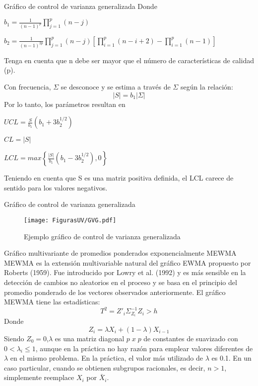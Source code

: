 \documentclass[10pt]{beamer}
\begin{document}
\begin{frame}{Gráfico de control de varianza generalizada}
Donde
\begin{center}
$b_1=\frac{1}{(n-1)^p}\prod\limits_{j=1}^{p}(n-j)$

$b_2=\frac{1}{(n-1)^{2p}}\prod\limits_{j=1}^{p}(n-j)\left[\prod\limits_{i=1}^{p}(n-i+2)-\prod\limits_{i=1}^{p}(n-1)\right]$
\end{center}
Tenga en cuenta que n debe ser mayor que el número de características de calidad (p).

Con frecuencia, $\Sigma$ se desconoce y se estima a través de $\Sigma$ según la relación:
$$|S|=b_1|\Sigma|$$
Por lo tanto, los parámetros resultan en
\begin{center}
$UCL=\frac{S}{b_1}(b_1 + 3b_2^{1/2})$

$CL=|S|$

$LCL=max\left\lbrace\frac{|S|}{b_1}(b_1 -3b_2^{1/2}), 0\right\rbrace$
\end{center}

Teniendo en cuenta que S es una matriz positiva definida, el LCL carece de sentido para los valores negativos.
\end{frame}

\begin{frame}{Gráfico de control de varianza generalizada}
\begin{figure}[h!]
  \centering
  \texttt{[image: FigurasUV/GVG.pdf]}
  \caption{Ejemplo gráfico de control de varianza generalizada}
\end{figure}
\end{frame}

\begin{frame}{Gráfico multivariante de promedios ponderados exponencialmente MEWMA}
MEWMA es la extensión multivariable natural del gráfico EWMA propuesto por Roberts (1959). Fue introducido por Lowry et al. (1992) y es más sensible en la detección de cambios no aleatorios en el proceso y se basa en el principio del promedio ponderado de los vectores observados anteriormente. El gráfico MEWMA tiene las estadísticas:
$$T^2=Z'_i\Sigma_{Z_i}^{-1}Z_i >h$$
Donde
$$Z_i=\lambda X_i+(1-\lambda)X_{i-1}$$
Siendo $Z_0=0$,$\lambda$ es una matriz diagonal $p\;x\;p$ de constantes de suavizado con $0<\lambda_i\leq 1$, aunque en la práctica no hay razón para emplear valores diferentes de $\lambda$ en el mismo problema. En la práctica, el valor más utilizado de $\lambda$ es 0.1. En un caso particular, cuando se obtienen subgrupos racionales, es decir, $n > 1$, simplemente reemplace $X_i$ por $\bar{X}_i$.
\end{frame}
\end{document}
